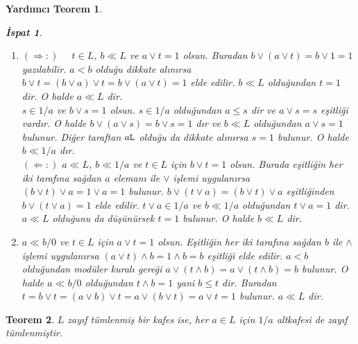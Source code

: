 \documentclass[a4paper,12pt]{article}
\numberwithin{equation}{section}
\theoremstyle{italik}
\newtheorem{teorem}{Teorem}[section]
\newtheorem{lemma}[teorem]{Yardımcı Teorem}
\newtheorem*{ispat}{İspat}
\begin{document}
\begin{lemma}
\begin{ispat}
\begin{enumerate}
 $c \in L $ ve $ t \in (b \vee c)/c  $ için $ (a \vee c ) \vee t = 1_{(b \vee c)/c} = b \vee c $ olsun. 
$ t \in (b \vee c)/c $ olduğundan $ c \leq t $ dir. Bu durumda $ a \vee t = a \vee (c \vee t) = (a \vee c ) \vee t = b \vee c $ 
elde edilir. $ a \vee t = b \vee c $ eşitliğinin iki tarafı, sağdan $b$ ile $\wedge$ işlemine tabi tutulursa 
$(a \vee t) \wedge b = (b \vee c) \wedge b = b $ elde edilir.
 $ a < b $ olduğundan modülerlik kuralı gereği $ a \vee (t \wedge b) = (a \vee t) \wedge b = b $ bulunur. 
$ t \wedge b \leq b $ olduğundan $ t \wedge b \in b/0 $ dır. Bu durumda $ a \ll b/0 $ ve 
$ a \vee (t \wedge b)=b=1_{b/0} $ olduğu dikkate alınırsa $ b \wedge t = 1_{b/0} = b $ bulunur. 
Bu ise $ b \leq t $ olmasını gerektirir. O halde $ b \vee c \leq t \vee c = t $ olur. Aynı zamanda 
$ t \in (b \vee c)/c $ olduğundan $ t \leq b \vee c $ dir. Buradan $ t = b \vee c $ bulunur. Böylece 
$ a \vee c \ll (b \vee c)/c $ bulunur.
\item $ (\Rightarrow :) $ \ \ 
$ t \in L $, $ b \ll L $ ve $ a \vee t = 1 $ olsun. Buradan $ b \vee (a \vee t ) = b \vee 1 = 1 $ yazılabilir. 
$ a < b $ olduğu dikkate alınırsa $ b \vee t = ( b \vee a ) \vee t = b \vee (a \vee t ) = 1 $ elde edilir. 
$ b \ll L $ olduğundan $ t = 1 $ dir. O halde $ a \ll L $ dir. \\
$ s \in 1/a $ ve $ b \vee s = 1 $ olsun. $ s \in 1/a $ olduğundan $ a \leq s $ dir ve $ a \vee s = s $ eşitliği 
vardır. O halde $ b \vee (a \vee s) = b \vee s = 1 $ dır ve $ b \ll L $ olduğundan $ a \vee s = 1 $ bulunur. 
Diğer taraftan $ a \tt L $ olduğu da dikkate alınırsa $ s= 1 $ bulunur. O halde $ b \ll 1/a $ dır. \\
$ (\Leftarrow :) $ \quad $ a \ll L $, $ b \ll 1/a $ ve $ t \in L $ için $ b \vee t = 1 $ olsun. Burada eşitliğin 
her iki tarafına sağdan $ a $ elemanı ile $ \vee $ işlemi uygulanırsa $ ( b \vee t ) \vee a = 1 \vee a = 1 $ bulunur. 
$ b \vee (t \vee a) = ( b \vee t ) \vee a $ eşitliğinden $ b \vee (t \vee a) = 1 $ elde edilir. 
$ t \vee a \in 1/a $ ve $ b \ll 1/a $ olduğundan $ t \vee a = 1 $ dir. $ a \ll L $ olduğunu da 
düşünürsek $ t = 1 $ bulunur. O halde $ b \ll L $ dir.
\item $ a \ll b/0 $ ve $ t \in L $ için $ a\vee t = 1 $ olsun. Eşitliğin her iki tarafına sağdan $ b $ ile $ \wedge $ 
işlemi uygulanırsa $ (a \vee t) \wedge b = 1 \wedge b = b $ eşitliği elde edilir. $ a < b $ olduğundan 
modüler kuralı gereği $ a \vee (t \wedge b) = a \vee (t \wedge b) = b $ bulunur. O halde $ a \ll b/0 $ olduğundan 
$ t \wedge b = 1 $ yani $ b \leq t $ dir. Buradan $ t = b \vee t = (a \vee b) \vee t = a \vee (b \vee t) = a \vee t = 1 $ 
bulunur. $ a \ll L $ dir.
\end{enumerate}
\end{ispat}
\end{lemma}
\begin{teorem}\label{thm:teo2}
$ L $ zayıf tümlenmiş bir kafes ise, her $ a \in L $ için $ 1/a $ altkafesi de zayıf tümlenmiştir.
\end{teorem}
\end{document}
